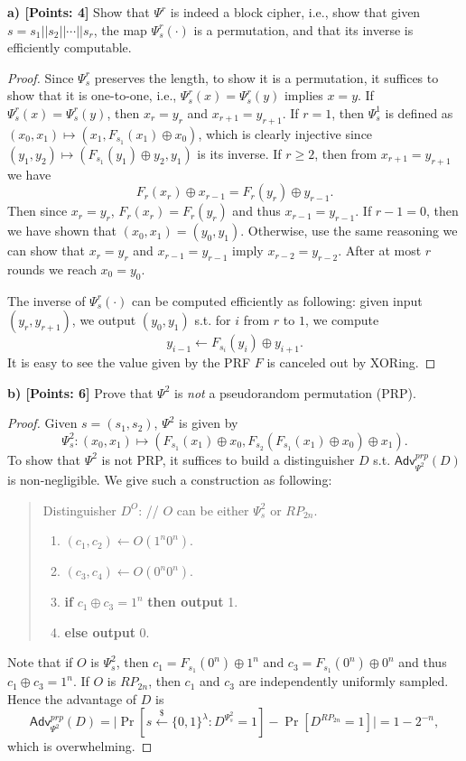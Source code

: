 \documentclass[12pt]{article}
\newcommand{\bits}{\{0,1\}}
\newcommand{\getsr}{\stackrel{\$}{\gets}}
\newcommand{\Adv}{\textsf{Adv}}
\theoremstyle{definition}
\begin{document}
{\bf a) [Points: 4]} Show that $\Psi^r$ is indeed a block cipher, i.e., show that given $s = s_1 || s_2 || \cdots || s_r$, the map $\Psi_s^r(\cdot)$ is a permutation, and that its inverse is efficiently computable.

\begin{proof}
Since $\Psi_s^r$ preserves the length, to show it is a permutation, it suffices to show that it is one-to-one, i.e., $\Psi_s^r(x) = \Psi_s^r(y)$ implies $x = y$. If $\Psi_s^r(x) = \Psi_s^r(y)$, then $x_r = y_r$ and $x_{r+1} = y_{r+1}$. If $r=1$, then $\Psi_s^1$ is defined as $(x_0, x_1) \mapsto (x_1, F_{s_1}(x_1) \oplus x_{0})$, which is clearly injective since $(y_1,y_2) \mapsto (F_{s_1}(y_1)\oplus y_2, y_1)$ is its inverse. If $r \geq 2$, then from $x_{r+1} = y_{r+1}$ we have
$$F_{r}(x_{r}) \oplus x_{r-1} = F_{r}(y_{r}) \oplus y_{r-1}.$$ 
Then since $x_r = y_r$, $F_r(x_r) = F_r(y_r)$ and thus $x_{r-1} = y_{r-1}$. If $r-1=0$, then we have shown that $(x_0,x_1) = (y_0, y_1)$. Otherwise, use the same reasoning we can show that $x_{r} = y_{r}$ and $x_{r-1} = y_{r-1}$ imply $x_{r-2} = y_{r-2}$. After at most $r$ rounds we reach $x_0 = y_0$.

The inverse of $\Psi_s^r(\cdot)$ can be computed efficiently as following: given input $(y_r, y_{r+1})$, we output $(y_0, y_1)$ s.t. for $i$ from $r$ to $1$, we compute
$$y_{i-1} \gets F_{s_i}(y_i) \oplus y_{i+1}.$$
It is easy to see the value given by the PRF $F$ is canceled out by XORing.
\end{proof}

{\bf b) [Points: 6]} Prove that $\Psi^2$ is \emph{not} a pseudorandom permutation (PRP).
\begin{proof}
Given $s = (s_1, s_2)$, $\Psi^2$ is given by 
$$\Psi_s^2 : (x_0,x_1) \mapsto (F_{s_1}(x_1) \oplus x_{0}, F_{s_2}(F_{s_1}(x_1) \oplus x_{0}) \oplus x_1).$$
To show that $\Psi^2$ is not PRP, it suffices to build a distinguisher $D$ s.t. $\Adv_{\Psi^2}^{prp}(D)$ is non-negligible. We give such a construction as following:
\begin{quote}
Distinguisher $D^O$: // $O$ can be either $\Psi_s^2$ or $RP_{2n}$.
\begin{enumerate}
\item $(c_1,c_2) \gets O(1^n0^n)$.
\item $(c_3,c_4) \gets O(0^n0^n)$.
\item {\bf if} $c_1 \oplus c_3 = 1^n$ {\bf then output} 1.
\item {\bf else output} 0.
\end{enumerate}
\end{quote}
Note that if $O$ is $\Psi_s^2$, then $c_1 = F_{s_1}(0^n) \oplus 1^n$ and $c_3 = F_{s_1}(0^n) \oplus 0^n$ and thus $c_1 \oplus c_3 = 1^n$. If $O$ is $RP_{2n}$, then $c_1$ and $c_3$ are independently uniformly sampled. Hence the advantage of $D$ is
$$\Adv_{\Psi^2}^{prp}(D) = \bigg| \Pr[s \getsr \bits^\lambda : D^{\Psi_s^2} = 1] - \Pr[D^{RP_{2n}}=1] \bigg| = 1 - 2^{-n},$$
which is overwhelming.
\end{proof}
\end{document}
